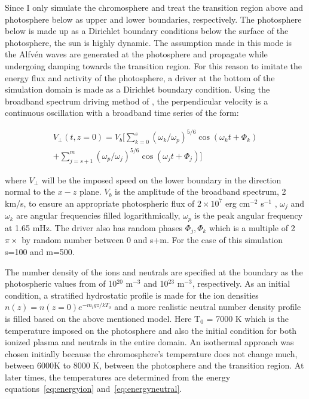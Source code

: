 \documentclass[12pt,upcase]{umlthesis}
\begin{document}
Since I only simulate the chromosphere and treat the transition region above and photosphere below as upper and lower boundaries, respectively. The photosphere below is made up as a Dirichlet boundary conditions below the surface of the photosphere, the sun is highly dynamic. The assumption made in this mode is the Alfv\'en waves are generated at the photosphere and propagate while undergoing damping towards the transition region. For this reason to imitate the energy flux and activity of the photosphere, a driver at the bottom of the simulation domain is made as a Dirichlet boundary condition. Using the broadband spectrum driving method of \citet{Tu2013}, the perpendicular velocity is a continuous oscillation with a broadband time series of the form:

\begin{equation}
\begin{aligned}
	V_{\perp} (t, z=0) = V_b [ \sum_{k=0}^s {(\omega_k/\omega_p)}^{5/6} \cos{(\omega_k t + \Phi_k)} \\
	+ \sum_{j=s+1}^m {(\omega_p/\omega_j)}^{5/6} \cos{(\omega_j t + \Phi_j)} ]
\end{aligned}
\end{equation}

where $V_{\perp}$ will be the imposed speed on the lower boundary in the direction normal to the $x-z$ plane. $V_b$ is the amplitude of the broadband spectrum, 2 km/s, to ensure an appropriate photospheric flux of $2 \times 10^7$ erg cm$^{-2}$ s$^{-1}$ \citep[see][section 3.2]{Tu2013}, $\omega_j$ and $\omega_k$ are angular frequencies filled logarithmically, $\omega_p$ is the peak angular frequency at 1.65 mHz. The driver also has random phases $\Phi_j, \Phi_k$ which is a multiple of 2$\pi \times$ by random number between 0 and s+m. For the case of this simulation s=100 and m=500. 

The number density of the ions and neutrals are specified at the boundary as the photospheric values from \citet{AvrettLoeser2008} of 10$^{20}$ m$^{-3}$ and 10$^{23}$ m$^{-3}$, respectively. As an initial condition, a stratified hydrostatic profile is made for the ion densities $n(z) = n(z=0) e^{-m_{i}gz/kT_0}$ and a more realistic neutral number density profile is filled based on the above mentioned model. Here T$_0$ = 7000 K which is the temperature imposed on the photosphere and also the initial condition for both ionized plasma and neutrals in the entire domain. An isothermal approach was chosen initially because the chromosphere's temperature does not change much, between 6000K to 8000 K, between the photosphere and the transition region. At later times, the temperatures are determined from the energy equations~\ref{eq:energyion} and~\ref{eq:energyneutral}. 
\end{document}
